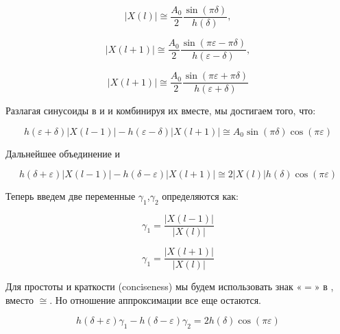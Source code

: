 \begin{equation}
\label{eq:equation26}
\left| {X(l)} \right| \cong \frac{A_0}{2} \frac{\sin{(\pi \delta)} }{h(\delta)} ,
\end{equation}

\begin{equation}
\label{eq:equation27}
\left| {X(l+1)} \right| \cong \frac{A_0}{2} \frac{\sin{(\pi \varepsilon - \pi \delta)} }{h(\varepsilon - \delta)} ,
\end{equation}

\begin{equation}
\label{eq:equation28}
\left| {X(l+1)} \right| \cong \frac{A_0}{2} \frac{\sin{(\pi \varepsilon + \pi \delta)} }{h(\varepsilon + \delta)}
\end{equation}

Разлагая синусоиды в  и  и комбинируя их вместе, мы достигаем того, что:

\begin{equation}
\label{eq:equation29}
h(\varepsilon+\delta)\left|{X(l-1)} \right| - h(\varepsilon-\delta) \left|{X(l+1)} \right| \cong A_0 \sin{(\pi \delta)} \cos{(\pi \varepsilon)}
\end{equation}

Дальнейшее объединение  и 

\begin{equation}
\label{eq:equation30}
h(\delta+\varepsilon)\left|{X(l-1)} \right| - h(\delta - \varepsilon) \left|{X(l+1)} \right| \cong 2 \left|{X(l)} \right| h(\delta) \cos{(\pi \varepsilon)}
\end{equation}

Теперь введем две переменные $\gamma_1$,$\gamma_2$ определяются как:

\begin{equation}
\label{eq:equation31}
\gamma_1 = \frac{\left| X(l-1)\right|}{\left| X(l)\right|}
\end{equation}

\begin{equation}
\label{eq:equation32}
\gamma_1 = \frac{\left| X(l+1)\right|}{\left| X(l)\right|}
\end{equation}

Для простоты и краткости (conciseness) мы будем использовать знак $«=»$ в , вместо $\cong$. Но отношение аппроксимации все еще остаются. 

\begin{equation}
\label{eq:equation33}
h(\delta +\varepsilon)\gamma_1 - h(\delta -\varepsilon)\gamma_2 = 
2h(\delta) \cos(\pi \varepsilon) 
\end{equation}

